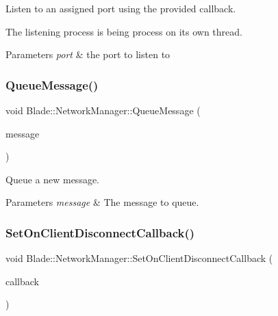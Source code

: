 Listen to an assigned port using the provided callback. 

The listening process is being process on its own thread. 
\begin{DoxyParams}{Parameters}
{\em port} & the port to listen to \\
\hline
\end{DoxyParams}
\mbox{\label{class_blade_1_1_network_manager_a3127ee70f644dedfa8be9372805f6d5a}} 
\subsubsection{\texorpdfstring{Queue\+Message()}{QueueMessage()}}
{\footnotesize\ttfamily void Blade\+::\+Network\+Manager\+::\+Queue\+Message (\begin{DoxyParamCaption}\item[{const std\+::shared\+\_\+ptr$<$ \hyperlink{class_blade_1_1_network_message}{Network\+Message} $>$ \&}]{message }\end{DoxyParamCaption})\hspace{0.3cm}{\ttfamily [noexcept]}}



Queue a new message. 


\begin{DoxyParams}{Parameters}
{\em message} & The message to queue. \\
\hline
\end{DoxyParams}
\mbox{\label{class_blade_1_1_network_manager_ada4cd3f291d3775e7467c5be31090a99}} 
\subsubsection{\texorpdfstring{Set\+On\+Client\+Disconnect\+Callback()}{SetOnClientDisconnectCallback()}}
{\footnotesize\ttfamily void Blade\+::\+Network\+Manager\+::\+Set\+On\+Client\+Disconnect\+Callback (\begin{DoxyParamCaption}\item[{const On\+Client\+Disconnect\+Callback \&}]{callback }\end{DoxyParamCaption})\hspace{0.3cm}{\ttfamily [noexcept]}}



